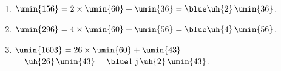    \ \\ [-5mm]
   \begin{enumerate}
      \item $\umin{156} =2\times\umin{60}+\umin{36} =\blue \uh{2}\,\umin{36}$.
      \item $\umin{296} =4\times\umin{60}+\umin{56} =\blue \uh{4}\,\umin{56}$.
      \item $\umin{1603} =26\times\umin{60}+\umin{43}$ \\
         \quad $=\uh{26}\,\umin{43} =\blue 1\text{ j}\,\uh{2}\,\umin{43}$.
   \end{enumerate}
